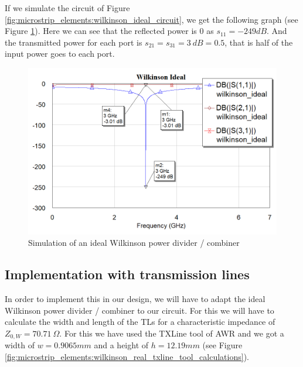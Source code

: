\documentclass[12pt]{report} %
\begin{document}
If we simulate the circuit of Figure \ref{fig:microstrip_elements:wilkinson_ideal_circuit}, we get the following graph (see Figure \ref{fig:microstrip_elements:wilkinson_ideal_graph}). Here we can see that the reflected power is 0 as $s_{11} = - 249 dB$. And the transmitted power for each port is $s_{21} = s_{31} = 3 \ dB = 0.5$, that is half of the input power goes to each port.

\begin{figure}[htbp]
    \centering
    \includegraphics[width=1\linewidth]{images//microstrip_elements/wilkinson_ideal_graph.png}
    \caption{Simulation of an ideal Wilkinson power divider / combiner}
    \label{fig:microstrip_elements:wilkinson_ideal_graph}
\end{figure}

\subsection{Implementation with transmission lines}

In order to implement this in our design, we will have to adapt the ideal Wilkinson power divider / combiner to our circuit. For this we will have to calculate the width and length of the TLs for a characteristic impedance of $Z_{0,W} = 70.71 \ \Omega$. For this we have used the TXLine tool of AWR and we got a width of $w = 0.9065 mm$ and a height of $h = 12.19 mm$ (see Figure \ref{fig:microstrip_elements:wilkinson_real_txline_tool_calculations}).
\end{document}
